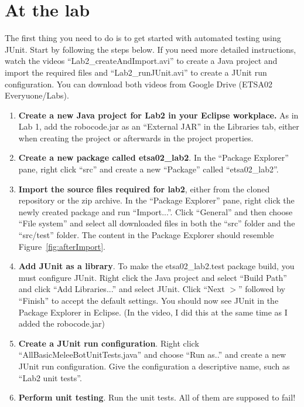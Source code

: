 \documentclass{scrreprt}
\begin{document}
\chapter{At the lab}
The first thing you need to do is to get started with automated testing using JUnit. Start by following the steps below. If you need more detailed instructions, watch the videos ``Lab2_createAndImport.avi'' to create a Java project and import the required files and ``Lab2_runJUnit.avi'' to create a JUnit run configuration. You can download both videos from Google Drive (ETSA02 Everyuone/Labs).
\begin{enumerate}
\item \textbf{Create a new Java project for Lab2 in your Eclipse workplace.} As in Lab 1, add the robocode.jar as an ``External JAR'' in the Libraries tab, either when creating the project or afterwards in the project properties.
\item \textbf{Create a new package called etsa02_lab2}. In the ``Package Explorer'' pane, right click ``src'' and create a new ``Package'' called ``etsa02_lab2''.
\item \textbf{Import the source files required for lab2}, either from the cloned repository or the zip archive. In the ``Package Explorer'' pane, right click the newly created package and run ``Import...''. Click ``General'' and then choose ``File system'' and select all downloaded files in both the ``src'' folder and the ``src/test'' folder. The content in the Package Explorer should resemble Figure~\ref{fig:afterImport}.
\item \textbf{Add JUnit as a library}. To make the etsa02_lab2.test package build, you must configure JUnit. Right click the Java project and select ``Build Path'' and click ``Add Libraries...'' and select JUnit. Click ``Next $>$'' followed by ``Finish'' to accept the default settings. You should now see JUnit in the Package Explorer in Eclipse. (In the video, I did this at the same time as I added the robocode.jar)
\item \textbf{Create a JUnit run configuration}. Right click ``AllBasicMeleeBotUnitTests.java'' and choose ``Run as..'' and create a new JUnit run configuration. Give the configuration a descriptive name, such as ``Lab2 unit tests''.
\item \textbf{Perform unit testing}. Run the unit tests. All of them are supposed to fail!
\end{enumerate}
\end{document}
